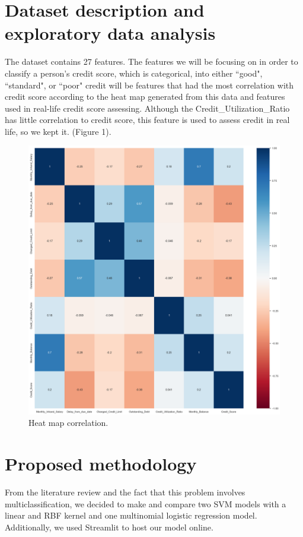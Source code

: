 \documentclass{article}
\begin{document}
\section*{Dataset description and exploratory data analysis}
The dataset contains 27 features. The features we will be focusing on in order
to classify a person's credit score, which is categorical, into either ``good", ``standard", or ``poor" credit
will be features that had the most correlation with credit score according to the heat map
generated from this data and features used in real-life credit score assessing. Although the Credit\_Utilization\_Ratio has little 
correlation to credit score, this feature is used to assess credit in real life, so we kept it. (Figure 1).\\
\begin{figure}[h]
    \includegraphics[width=\textwidth]{credscoreheatmap.png}
    \caption{Heat map correlation.}
    \label{fig:figure1}
\end{figure}
\newpage
\section*{Proposed methodology}
From the literature review and the fact that this problem involves multiclassification,
we decided to make and compare two SVM models with a linear and RBF kernel and one 
multinomial logistic regression model. Additionally, we used Streamlit to host our model online.
\end{document}
